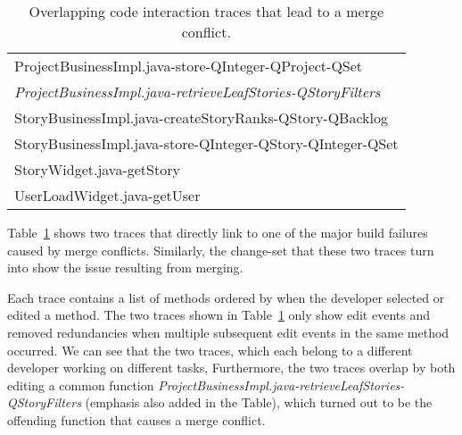 \begin{table}[t!]
\begin{tabular}{l}
     ProjectBusinessImpl.java-store-QInteger-QProject-QSet        \\%
     \emph{ProjectBusinessImpl.java-retrieveLeafStories-QStoryFilters}                                 \\%
     StoryBusinessImpl.java-createStoryRanks-QStory-QBacklog                     \\%
     StoryBusinessImpl.java-store-QInteger-QStory-QInteger-QSet  \\%
     StoryWidget.java-getStory                                                       \\%
     UserLoadWidget.java-getUser                                                     \\%
      \bottomrule
\end{tabular}
\caption{Overlapping code interaction traces that lead to a merge conflict.}
\label{tab:overlappingtraces}
\end{table}

Table~\ref{tab:overlappingtraces} shows two traces that directly link to one of the major build failures caused by merge conflicts.
Similarly, the change-set that these two traces turn into show the issue resulting from merging.

Each trace contains a list of methods ordered by when the developer selected or edited a method.
The two traces shown in Table~\ref{tab:overlappingtraces} only show edit events and removed redundancies when multiple subsequent edit events in the same method occurred.
We can see that the two traces, which each belong to a different developer working on different tasks, 
Furthermore, the two traces overlap by both editing a common function \emph{ProjectBusinessImpl.java-retrieveLeafStories-QStoryFilters} (emphasis also added in the Table), which turned out to be the offending function that causes a merge conflict.

